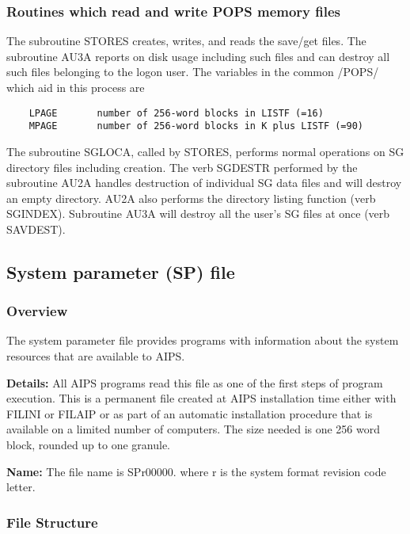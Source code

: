 \subsubsection{Routines which read and write POPS memory files}


     The subroutine STORES creates, writes, and reads the save/get
files.  The subroutine AU3A reports on disk usage including such
files and can destroy all such files belonging to the logon user.
The variables in the common /POPS/ which aid in this process are

\begin{verbatim}
    LPAGE       number of 256-word blocks in LISTF (=16)
    MPAGE       number of 256-word blocks in K plus LISTF (=90)
\end{verbatim}

The subroutine SGLOCA, called by STORES, performs normal operations on
SG directory files including creation.  The verb SGDESTR performed by
the subroutine AU2A handles destruction of individual SG data files
and will destroy an empty directory.  AU2A also performs the directory
listing function (verb SGINDEX).  Subroutine AU3A will destroy all
the user's SG files at once (verb SAVDEST).

\subsection{System parameter (SP) file}
\subsubsection{Overview}

  The system parameter file provides programs with information
about the system resources that are available to AIPS.

{\bf Details:} All AIPS programs read this file as one of the first
steps of program execution.  This is a permanent file created at AIPS
installation time either with FILINI or FILAIP or as part of an
automatic installation procedure that is available on a limited number
of computers.  The size needed is one 256 word block, rounded up to
one granule.

{\bf Name:}  The file name is SPr00000. where r is the system format
revision code letter.

\subsubsection{File Structure}

